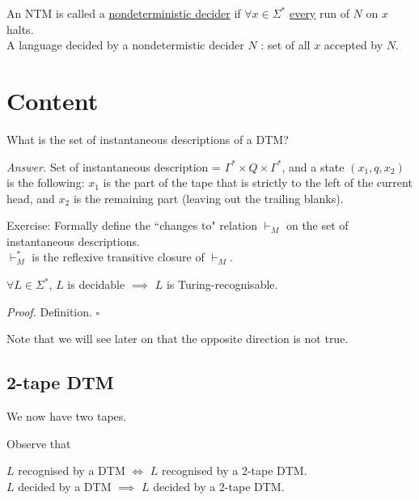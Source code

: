 \documentclass[a4paper]{article}
\newenvironment{proof}{\begin{breakbox}\textit{Proof.}}{\hfill$\square$\end{breakbox}}
\newenvironment{ans}{\begin{breakbox}\textit{Answer.}}{\end{breakbox}}
\newcommand{\nl}{\vspace{0.2cm}\\}
\newcommand{\changesto}{\vdash}
\begin{document}
\begin{defn}
    An NTM is called a \underline{nondeterministic decider} if $\forall x \in \Sigma^*$ \underline{every} run of $N$ on $x$ halts.\nl
    A language decided by a nondetermistic decider $N$ : set of all $x$ accepted by $N$.\nl
\end{defn}

\section{Content}

\begin{ques}
    What is the set of instantaneous descriptions of a DTM?
\end{ques}

\begin{ans}
    Set of instantaneous description = $\Gamma^* \times Q \times \Gamma^*$, and a state $(x_1, q, x_2)$ is the following:    
    $x_1$ is the part of the tape that is strictly to the left of the current head, and $x_2$ is the remaining part (leaving out the trailing blanks).
    
\end{ans}

    Exercise: Formally define the ``changes to" relation $\changesto_M$ on the set of instantaneous descriptions.\nl
    $\changesto^*_M$ is the reflexive transitive closure of $\changesto_M$.\nl

\begin{claim}
        $\forall L \in \Sigma^*$, $L$ is decidable $\implies$ $L$ is Turing-recognisable.
\end{claim}
\begin{proof}
        Definition.
\end{proof}

Note that we will see later on that the opposite direction is not true.\nl

\subsection{2-tape DTM}

We now have two tapes.

Observe that

\begin{theorem}
        $L$ recognised by a DTM $\iff$ $L$ recognised by a 2-tape DTM.\nl
        $L$ decided by a DTM $\implies$ $L$ decided by a 2-tape DTM.
\end{theorem}
\end{document}
